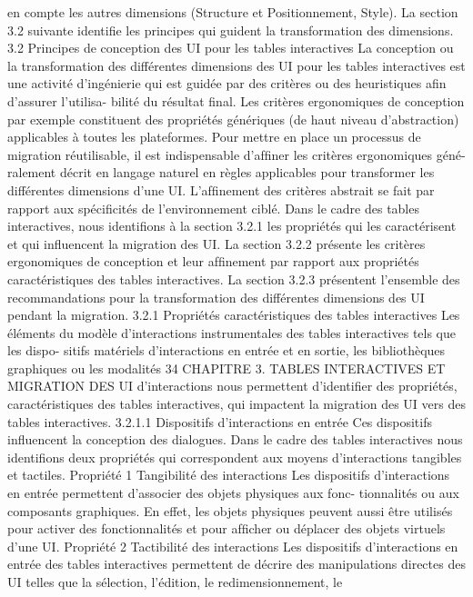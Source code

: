 \documentclass{article}
\begin{document}
en compte les autres dimensions (Structure et Positionnement, Style). La section 3.2 suivante identiﬁe
les principes qui guident la transformation des dimensions.
3.2
Principes de conception des UI pour les tables interactives
La conception ou la transformation des différentes dimensions des UI pour les tables interactives
est une activité d’ingénierie qui est guidée par des critères ou des heuristiques aﬁn d’assurer l’utilisa-
bilité du résultat ﬁnal. Les critères ergonomiques de conception par exemple constituent des propriétés
génériques (de haut niveau d’abstraction) applicables à toutes les plateformes. Pour mettre en place
un processus de migration réutilisable, il est indispensable d’afﬁner les critères ergonomiques géné-
ralement décrit en langage naturel en règles applicables pour transformer les différentes dimensions
d’une UI.
L’afﬁnement des critères abstrait se fait par rapport aux spéciﬁcités de l’environnement ciblé. Dans
le cadre des tables interactives, nous identiﬁons à la section 3.2.1 les propriétés qui les caractérisent et
qui inﬂuencent la migration des UI. La section 3.2.2 présente les critères ergonomiques de conception
et leur afﬁnement par rapport aux propriétés caractéristiques des tables interactives. La section 3.2.3
présentent l’ensemble des recommandations pour la transformation des différentes dimensions des UI
pendant la migration.
3.2.1
Propriétés caractéristiques des tables interactives
Les éléments du modèle d’interactions instrumentales des tables interactives tels que les dispo-
sitifs matériels d’interactions en entrée et en sortie, les bibliothèques graphiques ou les modalités
34
CHAPITRE 3. TABLES INTERACTIVES ET MIGRATION DES UI
d’interactions nous permettent d’identiﬁer des propriétés, caractéristiques des tables interactives, qui
impactent la migration des UI vers des tables interactives.
3.2.1.1
Dispositifs d’interactions en entrée
Ces dispositifs inﬂuencent la conception des dialogues. Dans le cadre des tables interactives nous
identiﬁons deux propriétés qui correspondent aux moyens d’interactions tangibles et tactiles.
Propriété 1 Tangibilité des interactions
Les dispositifs d’interactions en entrée permettent d’associer des objets physiques aux fonc-
tionnalités ou aux composants graphiques. En effet, les objets physiques peuvent aussi être
utilisés pour activer des fonctionnalités et pour afﬁcher ou déplacer des objets virtuels d’une
UI.
Propriété 2 Tactibilité des interactions
Les dispositifs d’interactions en entrée des tables interactives permettent de décrire des
manipulations directes des UI telles que la sélection, l’édition, le redimensionnement, le
\end{document}
